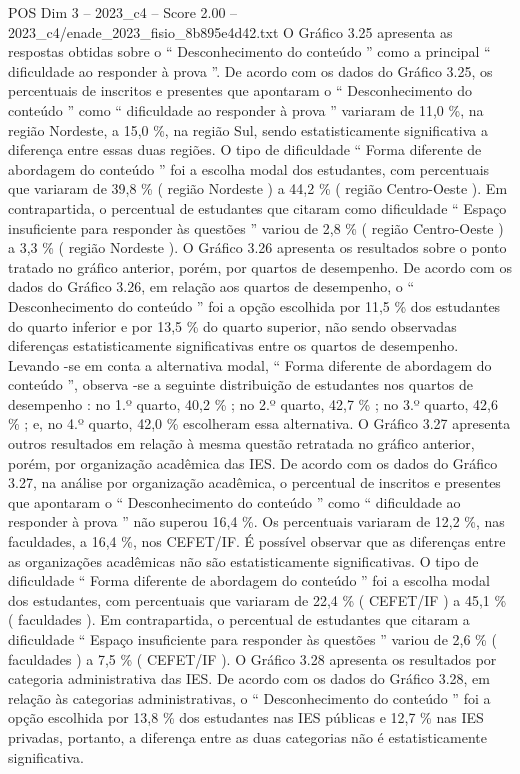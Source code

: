 \begin{textsample}{POS Dim 3 – 2023\_c4 – Score 2.00 – 2023\_c4/enade\_2023\_fisio\_8b895e4d42.txt}
O Gráfico 3.25 apresenta as respostas obtidas sobre o “ Desconhecimento do conteúdo ” como a principal “ dificuldade ao responder à prova ”.
De acordo com os dados do Gráfico 3.25, os percentuais de inscritos e presentes que apontaram o “ Desconhecimento do conteúdo ” como “ dificuldade ao responder à prova ” variaram de 11,0 \%, na região Nordeste, a 15,0 \%, na região Sul, sendo estatisticamente significativa a diferença entre essas duas regiões.
O tipo de dificuldade “ Forma diferente de abordagem do conteúdo ” foi a escolha modal dos estudantes, com percentuais que variaram de 39,8 \% ( região Nordeste ) a 44,2 \% ( região Centro-Oeste ).
Em contrapartida, o percentual de estudantes que citaram como dificuldade “ Espaço insuficiente para responder às questões ” variou de 2,8 \% ( região Centro-Oeste ) a 3,3 \% ( região Nordeste ).
O Gráfico 3.26 apresenta os resultados sobre o ponto tratado no gráfico anterior, porém, por quartos de desempenho.
De acordo com os dados do Gráfico 3.26, em relação aos quartos de desempenho, o “ Desconhecimento do conteúdo ” foi a opção escolhida por 11,5 \% dos estudantes do quarto inferior e por 13,5 \% do quarto superior, não sendo observadas diferenças estatisticamente significativas entre os quartos de desempenho.
Levando -se em conta a alternativa modal, “ Forma diferente de abordagem do conteúdo ”, observa -se a seguinte distribuição de estudantes nos quartos de desempenho : no 1.º quarto, 40,2 \% ; no 2.º quarto, 42,7 \% ; no 3.º quarto, 42,6 \% ; e, no 4.º quarto, 42,0 \% escolheram essa alternativa.
O Gráfico 3.27 apresenta outros resultados em relação à mesma questão retratada no gráfico anterior, porém, por organização acadêmica das IES.
De acordo com os dados do Gráfico 3.27, na análise por organização acadêmica, o percentual de inscritos e presentes que apontaram o “ Desconhecimento do conteúdo ” como “ dificuldade ao responder à prova ” não superou 16,4 \%.
Os percentuais variaram de 12,2 \%, nas faculdades, a 16,4 \%, nos CEFET/IF.
É possível observar que as diferenças entre as organizações acadêmicas não são estatisticamente significativas.
O tipo de dificuldade “ Forma diferente de abordagem do conteúdo ” foi a escolha modal dos estudantes, com percentuais que variaram de 22,4 \% ( CEFET/IF ) a 45,1 \% ( faculdades ).
Em contrapartida, o percentual de estudantes que citaram a dificuldade “ Espaço insuficiente para responder às questões ” variou de 2,6 \% ( faculdades ) a 7,5 \% ( CEFET/IF ).
O Gráfico 3.28 apresenta os resultados por categoria administrativa das IES.
De acordo com os dados do Gráfico 3.28, em relação às categorias administrativas, o “ Desconhecimento do conteúdo ” foi a opção escolhida por 13,8 \% dos estudantes nas IES públicas e 12,7 \% nas IES privadas, portanto, a diferença entre as duas categorias não é estatisticamente significativa.

\end{textsample}
